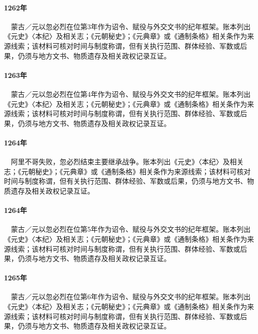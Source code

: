 \paragraph{1262年}　蒙古／元以忽必烈在位第3年作为诏令、赋役与外交文书的纪年框架。账本列出《元史》〈本纪〉及相关志；《元朝秘史》；《元典章》或《通制条格》相关条作为来源线索；该材料可核对时间与制度称谓，但有关执行范围、群体经验、军数或后果，仍须与地方文书、物质遗存及相关政权记录互证。

\paragraph{1263年}　蒙古／元以忽必烈在位第4年作为诏令、赋役与外交文书的纪年框架。账本列出《元史》〈本纪〉及相关志；《元朝秘史》；《元典章》或《通制条格》相关条作为来源线索；该材料可核对时间与制度称谓，但有关执行范围、群体经验、军数或后果，仍须与地方文书、物质遗存及相关政权记录互证。

\paragraph{1264年}　阿里不哥失败，忽必烈结束主要继承战争。账本列出《元史》〈本纪〉及相关志；《元朝秘史》；《元典章》或《通制条格》相关条作为来源线索；该材料可核对时间与制度称谓，但有关执行范围、群体经验、军数或后果，仍须与地方文书、物质遗存及相关政权记录互证。

\paragraph{1264年}　蒙古／元以忽必烈在位第5年作为诏令、赋役与外交文书的纪年框架。账本列出《元史》〈本纪〉及相关志；《元朝秘史》；《元典章》或《通制条格》相关条作为来源线索；该材料可核对时间与制度称谓，但有关执行范围、群体经验、军数或后果，仍须与地方文书、物质遗存及相关政权记录互证。

\paragraph{1265年}　蒙古／元以忽必烈在位第6年作为诏令、赋役与外交文书的纪年框架。账本列出《元史》〈本纪〉及相关志；《元朝秘史》；《元典章》或《通制条格》相关条作为来源线索；该材料可核对时间与制度称谓，但有关执行范围、群体经验、军数或后果，仍须与地方文书、物质遗存及相关政权记录互证。

